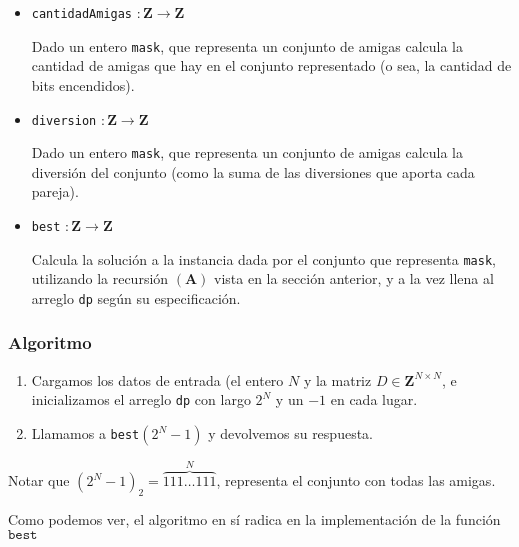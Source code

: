 \begin{itemize}
	\item \texttt{cantidadAmigas} $ : \mathbf{Z} \rightarrow \mathbf{Z}$
	
	Dado un entero \texttt{mask}, que representa un conjunto de amigas calcula la cantidad de amigas que hay en el conjunto representado (o sea, la cantidad de bits encendidos).

	\item \texttt{diversion} $ : \mathbf{Z} \rightarrow \mathbf{Z}$
	
	Dado un entero \texttt{mask}, que representa un conjunto de amigas calcula la diversión del conjunto (como la suma de las diversiones que aporta cada pareja).
	
	\item \texttt{best} $ : \mathbf{Z} \rightarrow \mathbf{Z}$
	
	Calcula la solución a la instancia dada por el conjunto que representa \texttt{mask}, utilizando la recursión $(\mathbf{A})$ vista en la sección anterior, y a la vez llena al arreglo \texttt{dp} según su especificación.
\end{itemize}

\subsubsection*{Algoritmo}

\begin{enumerate}
	\item Cargamos los datos de entrada (el entero $N$ y la matriz $D \in \mathbf{Z}^{N \times N}$, e inicializamos el arreglo \texttt{dp} con largo $2^N$ y un $-1$ en cada lugar.
	\item Llamamos a \texttt{best}$(2^N - 1)$ y devolvemos su respuesta. 
\end{enumerate}

 Notar que $(2^N-1)_2 = \overset{N}{\overbrace{111\dots111}}$, representa el conjunto con todas las amigas.
 
 Como podemos ver, el algoritmo en sí radica en la implementación de la función $\texttt{best}$

